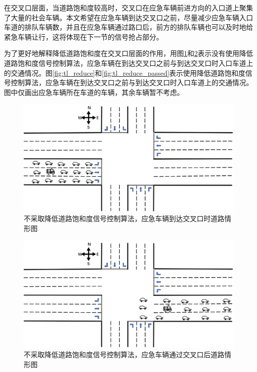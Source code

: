 在交叉口层面，当道路饱和度较高时，交叉口在应急车辆前进方向的入口道上聚集了大量的社会车辆。本文希望在应急车辆到达交叉口之前，尽量减少应急车辆入口车道的排队车辆数，并且在应急车辆通过路口后，前方的排队车辆也可以及时地给紧急车辆让行，这将体现在下一节的信号抢占部分。

为了更好地解释降低道路饱和度在交叉口层面的作用，用图\ref{fig:tl_unreduce}和\ref{fig:tl_unreduce_passed}表示没有使用降低道路饱和度信号控制算法，应急车辆在到达交叉口之前与到达交叉口时入口车道上的交通情况。图\ref{fig:tl_reduce}和\ref{fig:tl_reduce_passed}表示使用降低道路饱和度信号控制算法，应急车辆在到达交叉口之前与到达交叉口时入口车道上的交通情况。图中仅画出应急车辆所在车道的车辆，其余车辆暂不考虑。

\begin{figure}[H]
	\centering
	\includegraphics[width=\textwidth]{figures/tl_unreduce.png}
	\caption{不采取降低道路饱和度信号控制算法，应急车辆到达交叉口时道路情形图}
	\label{fig:tl_unreduce}
\end{figure}

\begin{figure}[H]
	\centering
	\includegraphics[width=\textwidth]{figures/tl_unreduce_passed.png}
	\caption{不采取降低道路饱和度信号控制算法，应急车辆通过交叉口后道路情形图}
	\label{fig:tl_unreduce_passed}
\end{figure}


